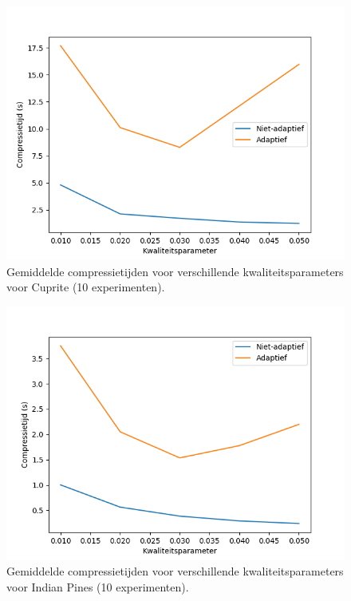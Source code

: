 \newpage
\begin{figure}[H]
  \centering
  \includegraphics[scale=0.7]{images/adaptive_timings_Cuprite.png}
  \caption{Gemiddelde compressietijden voor verschillende kwaliteitsparameters voor Cuprite (10 experimenten).}
  \label{fig:adaptive_timings_Cuprite}
\end{figure}

\begin{figure}[H]
  \centering
  \includegraphics[scale=0.7]{images/adaptive_timings_Indian_Pines.png}
  \caption{Gemiddelde compressietijden voor verschillende kwaliteitsparameters voor Indian Pines (10 experimenten).}
  \label{fig:adaptive_timings_Indian_Pines}
\end{figure}
